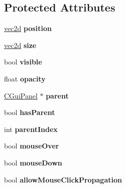 \subsection*{Protected Attributes}
\begin{DoxyCompactItemize}
\item 
\hypertarget{class_c_gui_panel_a59d0730f0ada91bd9bc3953afb352e5b}{
\hyperlink{classvec2d}{vec2d} {\bfseries position}}
\label{class_c_gui_panel_a59d0730f0ada91bd9bc3953afb352e5b}

\item 
\hypertarget{class_c_gui_panel_a6a846df6facc27740bc9ff09bdf832dc}{
\hyperlink{classvec2d}{vec2d} {\bfseries size}}
\label{class_c_gui_panel_a6a846df6facc27740bc9ff09bdf832dc}

\item 
\hypertarget{class_c_gui_panel_ab1d1e12901dc29f9848c3dba77051437}{
bool {\bfseries visible}}
\label{class_c_gui_panel_ab1d1e12901dc29f9848c3dba77051437}

\item 
\hypertarget{class_c_gui_panel_a84fcbf13394eb3060d1adac8e1f64d77}{
float {\bfseries opacity}}
\label{class_c_gui_panel_a84fcbf13394eb3060d1adac8e1f64d77}

\item 
\hypertarget{class_c_gui_panel_af1630bffed85174abb613e4f496dc575}{
\hyperlink{class_c_gui_panel}{CGuiPanel} $\ast$ {\bfseries parent}}
\label{class_c_gui_panel_af1630bffed85174abb613e4f496dc575}

\item 
\hypertarget{class_c_gui_panel_a9190bcac5a82d21d48f267dd1b55219e}{
bool {\bfseries hasParent}}
\label{class_c_gui_panel_a9190bcac5a82d21d48f267dd1b55219e}

\item 
\hypertarget{class_c_gui_panel_ad00229ce25e53a7c9253821132b64e53}{
int {\bfseries parentIndex}}
\label{class_c_gui_panel_ad00229ce25e53a7c9253821132b64e53}

\item 
\hypertarget{class_c_gui_panel_a11405fff49bc0b7b836e1df9634e2665}{
bool {\bfseries mouseOver}}
\label{class_c_gui_panel_a11405fff49bc0b7b836e1df9634e2665}

\item 
\hypertarget{class_c_gui_panel_a49decd8ebc8e4a9cf394d32554058bc7}{
bool {\bfseries mouseDown}}
\label{class_c_gui_panel_a49decd8ebc8e4a9cf394d32554058bc7}

\item 
\hypertarget{class_c_gui_panel_ae1dc00f87f038a77aa923942f17132b8}{
bool {\bfseries allowMouseClickPropagation}}
\label{class_c_gui_panel_ae1dc00f87f038a77aa923942f17132b8}


\end{DoxyCompactItemize}
